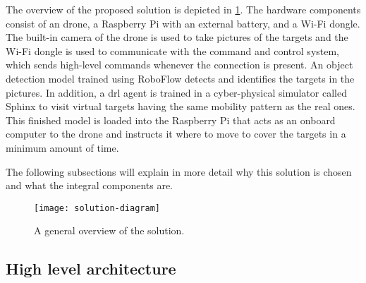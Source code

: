 \documentclass[../main.tex]{subfiles}
\begin{document}


                

The overview of the proposed solution is depicted in 
\cref{fig:solution-overview}. 
The hardware components consist of an \anafi drone,
a Raspberry Pi with an external battery, and a Wi-Fi
dongle. The built-in camera of the drone is used to
take pictures of the targets and the Wi-Fi dongle
is used to communicate with the command and control
system, which sends high-level commands whenever the
connection is present. An object detection model trained
using RoboFlow detects and identifies the targets in the
pictures. In addition, a \gls{drl} agent is trained 
in a cyber-physical simulator called Sphinx to
visit virtual targets having the same mobility pattern as the
real ones.
This finished model is loaded into the Raspberry Pi that acts
as an onboard computer to the \anafi drone and instructs
it where to move to cover the targets in a minimum amount
of time.

The following subsections will
explain in more detail why this solution is chosen
and what the integral components are.

\begin{figure}[tbp]
	\centering
	\texttt{[image: solution-diagram]}
	\caption{A general overview of the solution.}
	\label{fig:solution-overview}
\end{figure}

\subsection{High level architecture}
\end{document}
